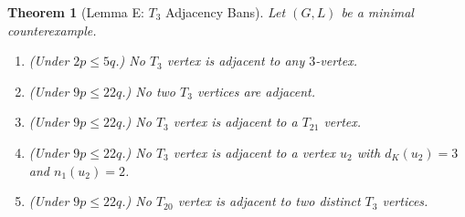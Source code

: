 \documentclass[11pt,a4paper]{article}
\newtheorem{theorem}{Theorem}[section]
\theoremstyle{definition}
\begin{document}
\begin{theorem}[Lemma E: $T_3$ Adjacency Bans]\label{thm:T3-adj}
Let $(G, L)$ be a minimal counterexample.
\begin{enumerate}[label=(E\arabic*),start=0,leftmargin=*,itemsep=2pt]
  \item \emph{(Under $2p \le 5q$.)} No $T_3$ vertex is adjacent to any $3$-vertex.
  \item \emph{(Under $9p \le 22q$.)} No two $T_3$ vertices are adjacent.
  \item \emph{(Under $9p \le 22q$.)} No $T_3$ vertex is adjacent to a $T_{21}$ vertex.
  \item \emph{(Under $9p \le 22q$.)} No $T_3$ vertex is adjacent to a vertex $u_2$ with $d_K(u_2) = 3$ and $n_1(u_2) = 2$.
  \item \emph{(Under $9p \le 22q$.)} No $T_{20}$ vertex is adjacent to two distinct $T_3$ vertices.
\end{enumerate}
\end{theorem}
\end{document}
